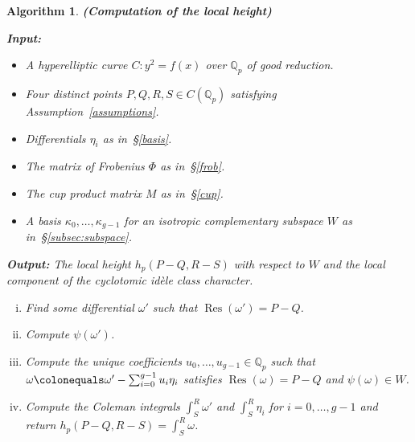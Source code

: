 \documentclass[11pt, a4paper]{amsart}
\newcommand{\Q}{\mathbb{Q}}
\newcommand{\p}{\mathfrak{p}}
\newcommand{\Res}{\operatorname{Res}}
\newtheorem{alg}[theorem]{Algorithm}
\theoremstyle{remark}
\newtheorem{remark}[theorem]{Remark}
\numberwithin{equation}{section}
\newcommand{\sg}{{}}
\newcommand{\sm}{{}}
\begin{document}
\begin{alg} \label{alg:hp}  {\bf (Computation of the local height)}
\hfill

\sm{ {\bf Input:} 
\begin{itemize}
    \item A hyperelliptic curve $C\colon y^2=f(x)$ over $\Q_p$ of good reduction. 
    \item Four distinct points $P,Q,R,S\in C(\Q_p)$ satisfying Assumption~\ref{assumptions}.
    \item Differentials $\eta_i$ as in~\S\ref{basis}.
    \item The matrix of Frobenius $\Phi$ as in~\S\ref{frob}.
    \item The cup product matrix $M$ as in~\S\ref{cup}.
    \item A basis $\kappa_0,\ldots,\kappa_{g-1}$ for an isotropic complementary subspace $W$ as in~\S\ref{subsec:subspace}.
\end{itemize}
{\bf Output:} The local height $h_p(P-Q,R-S)$ with respect to $W$ and the local component of the cyclotomic id\`ele class character.}
\begin{enumerate}[(i)]
  \item\label{om'} Find some differential $\omega'$ such that $\Res(\omega')=P-Q$.
  \item\label{psiom'} Compute $\psi(\omega')$.
\item\label{coeffs}  Compute the unique coefficients $u_0,\ldots,u_{g-1}\in
  \Q_p$ 
    such that
   \sg{$\omega\colonequals \omega' -\sum^{g-1}_{i=0}u_i\eta_i$} satisfies $\Res(\omega)=P-Q$ and $\psi(\omega)\in W$.
\item\label{ints}  Compute the Coleman integrals $\int_S ^R \omega'$ and \sg{$\int_S ^R \eta_i$} for
  $i=0,\ldots,g-1$ and return $h_p(P-Q,R-S) =\int^R_S\omega$. 
\end{enumerate}
\end{alg}
\end{document}
